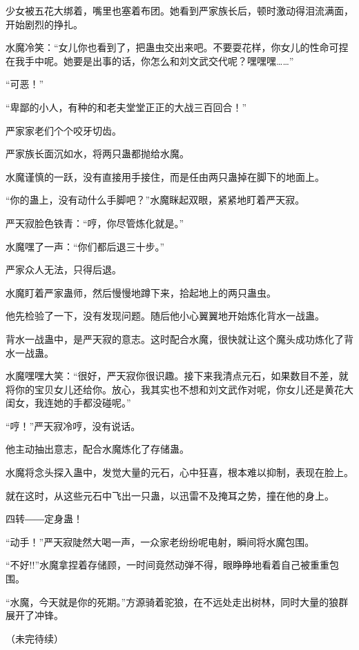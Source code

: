 \begin{this_body}
少女被五花大绑着，嘴里也塞着布团。她看到严家族长后，顿时激动得泪流满面，开始剧烈的挣扎。

水魔冷笑：“女儿你也看到了，把蛊虫交出来吧。不要耍花样，你女儿的性命可捏在我手中呢。她要是出事的话，你怎么和刘文武交代呢？嘿嘿嘿……”

“可恶！”

“卑鄙的小人，有种的和老夫堂堂正正的大战三百回合！”

严家家老们个个咬牙切齿。

严家族长面沉如水，将两只蛊都抛给水魔。

水魔谨慎的一跃，没有直接用手接住，而是任由两只蛊掉在脚下的地面上。

“你的蛊上，没有动什么手脚吧？”水魔眯起双眼，紧紧地盯着严天寂。

严天寂脸色铁青：“哼，你尽管炼化就是。”

水魔嘿了一声：“你们都后退三十步。”

严家众人无法，只得后退。

水魔盯着严家蛊师，然后慢慢地蹲下来，拾起地上的两只蛊虫。

他先检验了一下，没有发现问题。随后他小心翼翼地开始炼化背水一战蛊。

背水一战蛊中，是严天寂的意志。这时配合水魔，很快就让这个魔头成功炼化了背水一战蛊。

水魔嘿嘿大笑：“很好，严天寂你很识趣。接下来我清点元石，如果数目不差，就将你的宝贝女儿还给你。放心，我其实也不想和刘文武作对呢，你女儿还是黄花大闺女，我连她的手都没碰呢。”

“哼！”严天寂冷哼，没有说话。

他主动抽出意志，配合水魔炼化了存储蛊。

水魔将念头探入蛊中，发觉大量的元石，心中狂喜，根本难以抑制，表现在脸上。

就在这时，从这些元石中飞出一只蛊，以迅雷不及掩耳之势，撞在他的身上。

四转――定身蛊！

“动手！”严天寂陡然大喝一声，一众家老纷纷呢电射，瞬间将水魔包围。

“不好!!”水魔拿捏着存储顾，一时间竟然动弹不得，眼睁睁地看着自己被重重包围。

“水魔，今天就是你的死期。”方源骑着驼狼，在不远处走出树林，同时大量的狼群展开了冲锋。

（未完待续）

\end{this_body}

